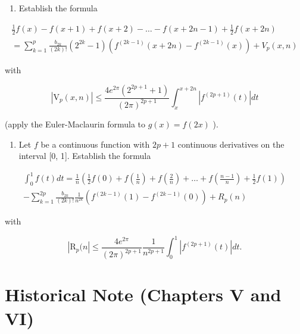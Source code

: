 \begin{enumerate}
\def\labelenumi{\arabic{enumi})}
\setcounter{enumi}{1}
\tightlist
\item
  Establish the formula
\end{enumerate}

\[
\begin{array}{l} \frac {1}{2} f (x) - f (x + 1) + f (x + 2) - \dots - f (x + 2 n - 1) + \frac {1}{2} f (x + 2 n) \\ = \sum_ {k = 1} ^ {p} \frac {b _ {2 k}}{(2 k) !} (2 ^ {2 k} - 1) (f ^ {(2 k - 1)} (x + 2 n) - f ^ {(2 k - 1)} (x)) + V _ {p} (x, n) \end{array}
\]

with

\[
\left| \mathrm{V} _ {p} (x, n) \right| \leqslant \frac {4 e ^ {2 \pi} \left(2 ^ {2 p + 1} + 1\right)}{(2 \pi) ^ {2 p + 1}} \int_ {x} ^ {x + 2 n} \left| f ^ {(2 p + 1)} (t) \right| d t
\]

(apply the Euler-Maclaurin formula to \(g(x) = f(2x)\) ).

\begin{enumerate}
\def\labelenumi{\arabic{enumi})}
\setcounter{enumi}{2}
\tightlist
\item
  Let \(f\) be a continuous function with \(2p + 1\) continuous derivatives on the interval {[}0, 1{]}. Establish the formula
\end{enumerate}

\[
\begin{array}{l} \int_ {0} ^ {1} f (t) d t = \frac {1}{n} \left(\frac {1}{2} f (0) + f \left(\frac {1}{n}\right) + f \left(\frac {2}{n}\right) + \dots + f \left(\frac {n - 1}{n}\right) + \frac {1}{2} f (1)\right) \\ - \sum_ {k = 1} ^ {2 p} \frac {b _ {2 k}}{(2 k) !} \frac {1}{n ^ {2 k}} (f ^ {(2 k - 1)} (1) - f ^ {(2 k - 1)} (0)) + R _ {p} (n) \end{array}
\]

with

\[
\left| \mathrm{R} _ {p} (n \right| \leqslant \frac {4 e ^ {2 \pi}}{(2 \pi) ^ {2 p + 1}} \frac {1}{n ^ {2 p + 1}} \int_ {0} ^ {1} \left| f ^ {(2 p + 1)} (t) \right| d t.
\]

\section*{Historical Note (Chapters V and VI)}
{}

